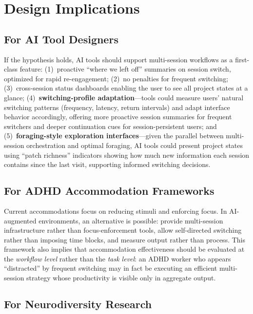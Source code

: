 \documentclass[sigconf,nonacm]{acmart}
\begin{document}
\section{Design Implications}
\label{sec:design}

\subsection{For AI Tool Designers}

If the hypothesis holds, AI tools should support multi-session workflows as a first-class feature: (1)~proactive ``where we left off'' summaries on session switch, optimized for rapid re-engagement; (2)~no penalties for frequent switching; (3)~cross-session status dashboards enabling the user to see all project states at a glance; (4)~\textbf{switching-profile adaptation}---tools could measure users' natural switching patterns (frequency, latency, return intervals) and adapt interface behavior accordingly, offering more proactive session summaries for frequent switchers and deeper continuation cues for session-persistent users; and (5)~\textbf{foraging-style exploration interfaces}---given the parallel between multi-session orchestration and optimal foraging, AI tools could present project states using ``patch richness'' indicators showing how much new information each session contains since the last visit, supporting informed switching decisions.

\subsection{For ADHD Accommodation Frameworks}

Current accommodations focus on reducing stimuli and enforcing focus. In AI-augmented environments, an alternative is possible: provide multi-session infrastructure rather than focus-enforcement tools, allow self-directed switching rather than imposing time blocks, and measure output rather than process. This framework also implies that accommodation effectiveness should be evaluated at the \emph{workflow level} rather than the \emph{task level}: an ADHD worker who appears ``distracted'' by frequent switching may in fact be executing an efficient multi-session strategy whose productivity is visible only in aggregate output.

\subsection{For Neurodiversity Research}
\end{document}
